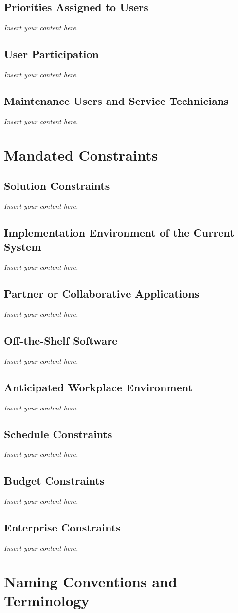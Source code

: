 \documentclass[12pt]{article}
\newcommand{\lips}{\textit{Insert your content here.}}
\begin{document}
\subsection{Priorities Assigned to Users}
\lips
\subsection{User Participation}
\lips
\subsection{Maintenance Users and Service Technicians}
\lips

\section{Mandated Constraints}
\subsection{Solution Constraints}
\lips
\subsection{Implementation Environment of the Current System}
\lips
\subsection{Partner or Collaborative Applications}
\lips
\subsection{Off-the-Shelf Software}
\lips
\subsection{Anticipated Workplace Environment}
\lips
\subsection{Schedule Constraints}
\lips
\subsection{Budget Constraints}
\lips
\subsection{Enterprise Constraints}
\lips

\section{Naming Conventions and Terminology}
\end{document}

